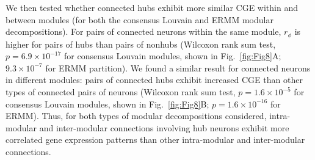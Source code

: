 \documentclass[10pt,letterpaper]{article}
\begin{document}
{%
We then tested whether connected hubs exhibit more similar CGE within and between modules (for both the consensus Louvain and ERMM modular decompositions).
For pairs of connected neurons within the same module, $r_\phi$ is higher for pairs of hubs than pairs of nonhubs (Wilcoxon rank sum test, $p = 6.9\times 10^{-17}$ for consensus Louvain modules, shown in Fig.~\ref{fig:Fig8}A; $9.3 \times 10^{-7}$ for ERMM partition).
We found a similar result for connected neurons in different modules: pairs of connected hubs exhibit increased CGE than other types of connected pairs of neurons (Wilcoxon rank sum test, $p = 1.6 \times 10^{-5}$ for consensus Louvain modules, shown in Fig.~\ref{fig:Fig8}B; $p = 1.6 \times 10^{-16}$ for ERMM).
Thus, for both types of modular decompositions considered, intra-modular and inter-modular connections involving hub neurons exhibit more correlated gene expression patterns than other intra-modular and inter-modular connections.

}
\end{document}
